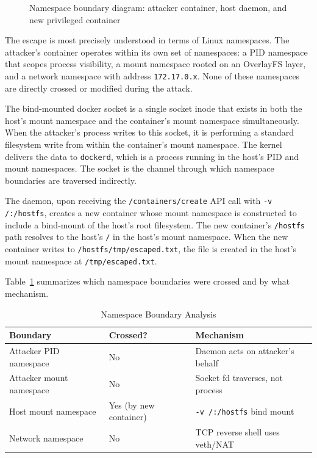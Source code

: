 \begin{figure}[h]
\centering
\vspace{3cm}
\caption{Namespace boundary diagram: attacker container, host daemon, and new privileged container}
\end{figure}

The escape is most precisely understood in terms of Linux namespaces. The attacker's container operates within its own set of namespaces: a PID namespace that scopes process visibility, a mount namespace rooted on an OverlayFS layer, and a network namespace with address \texttt{172.17.0.x}. None of these namespaces are directly crossed or modified during the attack.

The bind-mounted docker socket is a single socket inode that exists in both the host's mount namespace and the container's mount namespace simultaneously. When the attacker's process writes to this socket, it is performing a standard filesystem write from within the container's mount namespace. The kernel delivers the data to \texttt{dockerd}, which is a process running in the host's PID and mount namespaces. The socket is the channel through which namespace boundaries are traversed indirectly.

The daemon, upon receiving the \texttt{/containers/create} API call with \texttt{-v /:/hostfs}, creates a new container whose mount namespace is constructed to include a bind-mount of the host's root filesystem. The new container's \texttt{/hostfs} path resolves to the host's \texttt{/} in the host's mount namespace. When the new container writes to \texttt{/hostfs/tmp/escaped.txt}, the file is created in the host's mount namespace at \texttt{/tmp/escaped.txt}.

Table~\ref{tab:namespace_boundaries} summarizes which namespace boundaries were crossed and by what mechanism.

\begin{table}[h]
\centering
\caption{Namespace Boundary Analysis}
\label{tab:namespace_boundaries}
\begin{tabular}{|l|l|l|}
\hline
\textbf{Boundary} & \textbf{Crossed?} & \textbf{Mechanism} \\
\hline
Attacker PID namespace & No & Daemon acts on attacker's behalf \\
Attacker mount namespace & No & Socket fd traverses, not process \\
Host mount namespace & Yes (by new container) & \texttt{-v /:/hostfs} bind mount \\
Network namespace & No & TCP reverse shell uses veth/NAT \\
\hline
\end{tabular}
\end{table}

